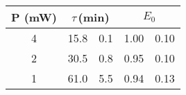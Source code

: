 \begin{tabular}{cr@{$\,\pm\,$}lr@{$\,\pm\,$}l}
\toprule
P (mW)
   & \multicolumn{2}{c}{$\tau$\,(min)}
                 & \multicolumn{2}{c}{$E_0$} \\
\midrule

 4 &  15.8 & 0.1 &  1.00 & 0.10 \\
 2 &  30.5 & 0.8 &  0.95 & 0.10 \\
 1 &  61.0 & 5.5 &  0.94 & 0.13 \\
\bottomrule
\end{tabular}
